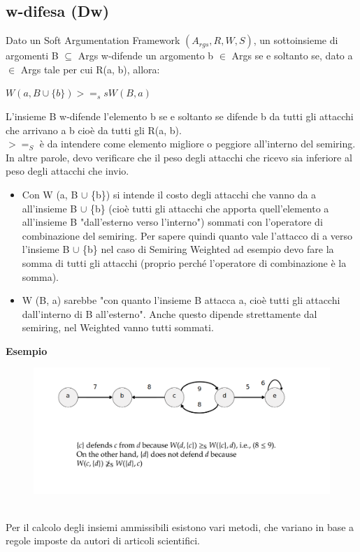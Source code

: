 \subsection{w-difesa (Dw)}
Dato un Soft Argumentation Framework $(A_{rgs} , R, W, S)$, un sottoinsieme di
argomenti B $\subseteq$ Args w-difende un argomento b $\in$ Args se e soltanto
se, dato a $\in$ Args tale per cui R(a, b), allora:
\begin{center}
    $W (a, B \cup \{b\}) >=_s s W (B, a)$
\end{center}
L'insieme B w-difende l'elemento b se e soltanto se difende b da tutti gli
attacchi che arrivano a b cioè da tutti gli R(a, b). \\$>=_S$ è da intendere
    come elemento migliore o peggiore all'interno del semiring. \\In altre parole,
    devo verificare che il peso degli attacchi che ricevo sia inferiore al peso
    degli attacchi che invio.
    \begin{itemize}
        \item Con W (a, B $\cup$ \{b\}) si intende il costo degli attacchi che
              vanno da a all'insieme B $\cup$ \{b\} (cioè tutti gli attacchi che
              apporta quell'elemento a all'insieme B "dall'esterno verso l'interno")
              sommati con l'operatore di combinazione del semiring. Per sapere quindi
              quanto vale l'attacco di a verso l'insieme B $\cup$ \{b\} nel caso di
              Semiring Weighted ad esempio devo fare la somma di tutti gli attacchi
              (proprio perché l'operatore di combinazione è la somma).
        \item W (B, a) sarebbe "con quanto l'insieme B attacca a, cioè tutti gli
              attacchi dall'interno di B all'esterno". Anche questo dipende
              strettamente dal semiring, nel Weighted vanno tutti sommati.
    \end{itemize}
    \textbf{Esempio}
    \begin{figure}[htp]
        \centering
        \includegraphics[width=14cm, keepaspectratio]{img/Cap6/srs2.png}
    \end{figure}
    \\Per il calcolo degli insiemi ammissibili esistono vari metodi, che variano
    in base a regole imposte da autori di articoli scientifici.


